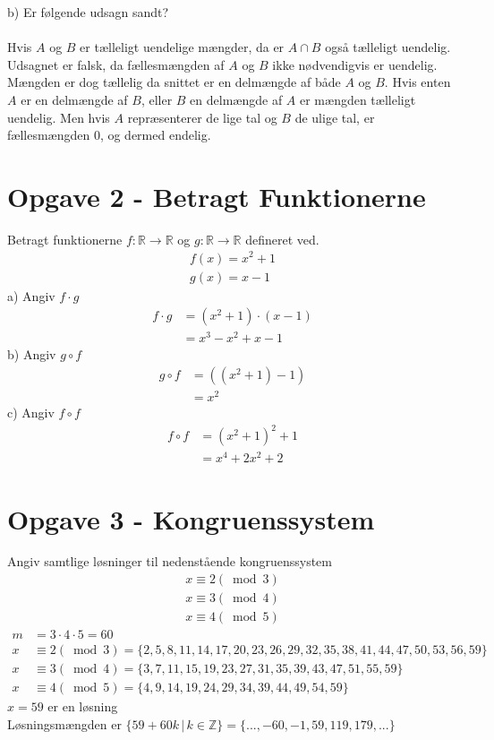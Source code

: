 \documentclass[a4paper,10pt]{article}
\begin{document}
b) Er følgende udsagn sandt?\\\\
Hvis $A$ og $B$ er tælleligt uendelige mængder, da er $A \cap B$ også tælleligt uendelig.
Udsagnet er falsk, da fællesmængden af $A$ og $B$ ikke nødvendigvis er uendelig. Mængden er dog tællelig da snittet er en delmængde af både $A$ og $B$. Hvis enten $A$ er en delmængde af $B$, eller $B$ en delmængde af $A$ er mængden tælleligt uendelig. Men hvis $A$ repræsenterer de lige tal og $B$ de ulige tal, er fællesmængden 0, og dermed endelig. 
\section{Opgave 2 - Betragt Funktionerne}
Betragt funktionerne $f: \mathbb{R} \rightarrow \mathbb{R}$ og $g: \mathbb{R} \rightarrow \mathbb{R}$ defineret ved.
\begin{align*}
f(x) = x^2+1\\
g(x) = x-1
\end{align*}
a) Angiv $f \cdot g$
\begin{align*}
f \cdot g &= (x^2+1)\cdot (x-1)\\
&= x^3-x^2+x-1
\end{align*}
b) Angiv $g \circ f$
\begin{align*}
g \circ f &= ((x^2+1)-1)\\
&= x^2
\end{align*}
c) Angiv $f \circ f$
\begin{align*}
f \circ f &= (x^2+1)^2+1\\
&= x^4+2x^2+2
\end{align*}
\section{Opgave 3 - Kongruenssystem}
Angiv samtlige løsninger til nedenstående kongruenssystem
\begin{align*}
x \equiv 2 (\bmod 3)\\
x \equiv 3 (\bmod 4)\\
x \equiv 4 (\bmod 5)
\end{align*}
\begin{align*}
m &= 3 \cdot 4 \cdot 5 = 60\\
x &\equiv 2 (\bmod 3) = \{2,5,8,11,14,17,20,23,26,29,32,35,38,41,44,47,50,53,56,59\}\\
x &\equiv 3 (\bmod 4) = \{3,7,11,15,19,23,27,31,35,39,43,47,51,55,59\}\\
x &\equiv 4 (\bmod 5) = \{4,9,14,19,24,29,34,39,44,49,54,59\}
\end{align*}
$x = 59$ er en løsning\\
Løsningsmængden er $\{59+60k\,|\,k \in \mathbb{Z}\} = \{...,-60,-1,59,119,179,...\}$
\end{document}
